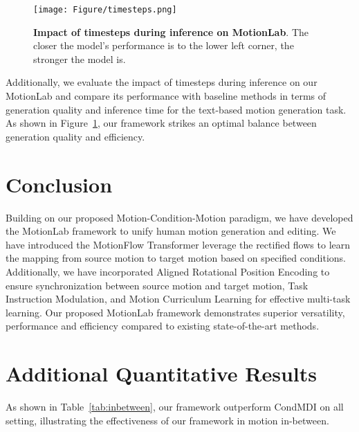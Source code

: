 \begin{figure}[!t]
  \centering
  \texttt{[image: Figure/timesteps.png]}
  \vspace{-.15in}
  \caption{\small{%
  \textbf{Impact of timesteps during inference on MotionLab}. The closer the model's performance is to the lower left corner, the stronger the model is.}}
  \vspace{-.2in}
  \label{fig:timestep}
\end{figure} 



Additionally, we evaluate the impact of timesteps during inference on our MotionLab and compare its performance with baseline methods in terms of generation quality and inference time for the text-based motion generation task. As shown in Figure~\ref{fig:timestep}, our framework strikes an optimal balance between generation quality and efficiency.


\section{Conclusion}
Building on our proposed Motion-Condition-Motion paradigm, we have developed the MotionLab framework to unify human motion generation and editing. We have introduced the MotionFlow Transformer leverage the rectified flows to learn the mapping from source motion to target motion based on specified conditions. Additionally, we have incorporated Aligned Rotational Position Encoding to ensure synchronization between source motion and target motion, Task Instruction Modulation, and Motion Curriculum Learning for effective multi-task learning. Our proposed MotionLab framework demonstrates superior versatility, performance and efficiency  compared to existing state-of-the-art methods.

\newpage


\clearpage

\appendix

\section{Additional Quantitative Results}

As shown in Table~\ref{tab:inbetween}, our framework outperform CondMDI on all setting, illustrating the effectiveness of our framework in motion in-between. %

